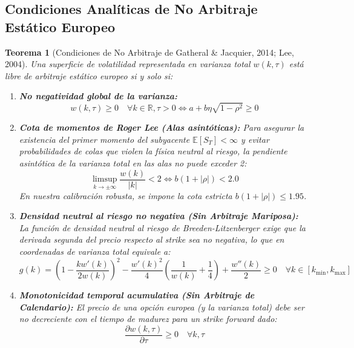 \documentclass[11pt,a4paper]{article}
\newtheorem{theorem}{Teorema}[section]
\begin{document}
\subsection{Condiciones Analíticas de No Arbitraje Estático Europeo}
\begin{theorem}[Condiciones de No Arbitraje de Gatheral \& Jacquier, 2014; Lee, 2004]
Una superficie de volatilidad representada en varianza total $w(k, \tau)$ está libre de arbitraje estático europeo si y solo si:
\begin{enumerate}
    \item \textbf{No negatividad global de la varianza:}
    \begin{equation}
        w(k, \tau) \ge 0 \quad \forall k \in \mathbb{R}, \tau > 0 \iff a + b \eta \sqrt{1 - \rho^2} \ge 0
    \end{equation}
    \item \textbf{Cota de momentos de Roger Lee (Alas asintóticas):}
    Para asegurar la existencia del primer momento del subyacente $\mathbb{E}[S_T] < \infty$ y evitar probabilidades de colas que violen la física neutral al riesgo, la pendiente asintótica de la varianza total en las alas no puede exceder 2:
    \begin{equation}
        \limsup_{k \to \pm \infty} \frac{w(k)}{|k|} < 2 \iff b(1 + |\rho|) < 2.0
    \end{equation}
    En nuestra calibración robusta, se impone la cota estricta $b(1 + |\rho|) \le 1.95$.
    \item \textbf{Densidad neutral al riesgo no negativa (Sin Arbitraje Mariposa):}
    La función de densidad neutral al riesgo de Breeden-Litzenberger exige que la derivada segunda del precio respecto al strike sea no negativa, lo que en coordenadas de varianza total equivale a:
    \begin{equation}
        g(k) = \left( 1 - \frac{k w'(k)}{2 w(k)} \right)^2 - \frac{w'(k)^2}{4} \left( \frac{1}{w(k)} + \frac{1}{4} \right) + \frac{w''(k)}{2} \ge 0 \quad \forall k \in [k_{\min}, k_{\max}]
    \end{equation}
    \item \textbf{Monotonicidad temporal acumulativa (Sin Arbitraje de Calendario):}
    El precio de una opción europea (y la varianza total) debe ser no decreciente con el tiempo de madurez para un strike forward dado:
    \begin{equation}
        \frac{\partial w(k, \tau)}{\partial \tau} \ge 0 \quad \forall k, \tau
    \end{equation}
\end{enumerate}
\end{theorem}
\end{document}
